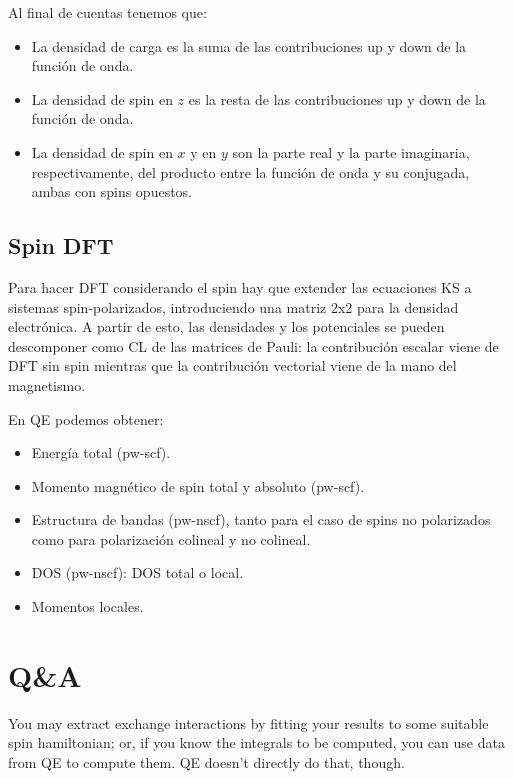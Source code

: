   Al final de cuentas tenemos que:
    \begin{itemize}
      \item La densidad de carga es la suma de las contribuciones up y down de la función de onda.
      \item La densidad de spin en $z$ es la resta de las contribuciones up y down de la función de onda.
      \item La densidad de spin en $x$ y en $y$ son la parte real y la parte imaginaria, respectivamente, del producto entre la función de onda y su conjugada, ambas con spins opuestos.
    \end{itemize}

\subsection{Spin DFT}

  Para hacer DFT considerando el spin hay que extender las ecuaciones KS a sistemas spin-polarizados, introduciendo una matriz 2x2 para la densidad electrónica. A partir de esto, las densidades y los potenciales se pueden descomponer como CL de las matrices de Pauli: la contribución escalar viene de DFT sin spin mientras que la contribución vectorial viene de la mano del magnetismo.

  En QE podemos obtener:
    \begin{itemize}
      \item Energía total (pw-scf).
      \item Momento magnético de spin total y absoluto  (pw-scf).
      \item Estructura de bandas (pw-nscf), tanto para el caso de spins no polarizados como para polarización colineal y no colineal.
      \item DOS (pw-nscf): DOS total o local.
      \item Momentos locales.
    \end{itemize}

\section{Q\&A}


  You may extract exchange interactions by fitting your results to some suitable spin hamiltonian; or, if you know the integrals to be computed, you can use data from QE to compute them. QE doesn't directly do that, though.

